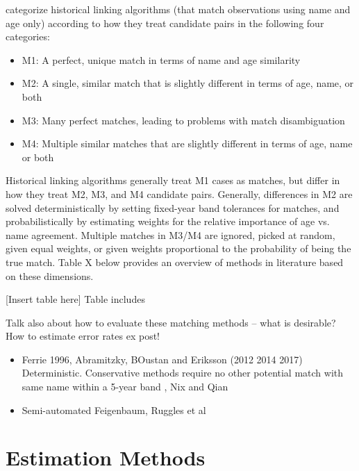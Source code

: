 \documentclass[12pt]{article}
\begin{document}
\cite{bailey2017} categorize historical linking algorithms (that match observations using name and age only) according to how they treat candidate pairs in the following four categories:
\begin{itemize}
\item M1: A perfect, unique match in terms of name and age similarity 
\item M2: A single, similar match that is slightly different in terms of age, name, or both
\item M3: Many perfect matches, leading to problems with match disambiguation
\item M4:  Multiple similar matches that are slightly different in terms of age, name or both 
\end{itemize}
Historical linking algorithms generally treat M1 cases as matches, but differ in how they treat M2, M3, and M4 candidate pairs.   Generally, differences in M2 are solved deterministically by setting fixed-year band tolerances for matches, and probabilistically by estimating weights for the relative importance of age vs. name agreement.  Multiple matches in M3/M4 are ignored, picked at random, given equal weights, or given weights proportional to the probability of being the true match.  Table X below provides an overview of methods in literature based on these dimensions. 

[Insert table here] 
Table includes 

Talk also about how to evaluate these matching methods -- what is desirable? How to estimate error rates ex post! 

\begin{itemize}
\item Ferrie 1996, Abramitzky, BOustan and Eriksson (2012 2014 2017) Deterministic.  Conservative methods require no other potential match with same name within a 5-year band , Nix and Qian
\item Semi-automated Feigenbaum, Ruggles et al 

\end{itemize}


\section{Estimation Methods}

\subsection{\cite{sw1993, sw1997}}
\end{document}
